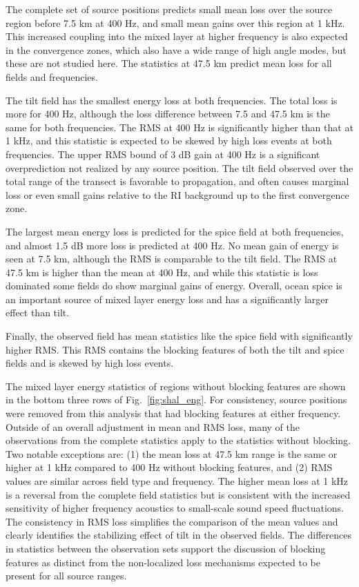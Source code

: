 \documentclass[preprint,NumberedRefs]{JASA}
\begin{document}
The complete set of source positions predicts small mean loss over the source region before 7.5 km at 400 Hz, and small mean gains over this region at 1 kHz. This increased coupling into the mixed layer at higher frequency is also expected in the convergence zones, which also have a wide range of high angle modes, but these are not studied here. The statistics at 47.5 km predict mean loss for all fields and frequencies.

The tilt field has the smallest energy loss at both frequencies. The total loss is more for 400 Hz, although the loss difference between 7.5 and 47.5 km is the same for both frequencies. The RMS at 400 Hz is significantly higher than that at 1 kHz, and this statistic is expected to be skewed by high loss events at both frequencies. The upper RMS bound of 3 dB gain at 400 Hz is a significant overprediction not realized by any source position. The tilt field observed over the total range of the transect is favorable to propagation, and often causes marginal loss or even small gains relative to the RI background up to the first convergence zone.

The largest mean energy loss is predicted for the spice field at both frequencies, and almost 1.5 dB more loss is predicted at 400 Hz. No mean gain of energy is seen at 7.5 km, although the RMS is comparable to the tilt field. The RMS at 47.5 km is higher than the mean at 400 Hz, and while this statistic is loss dominated some fields do show marginal gains of energy. Overall, ocean spice is an important source of mixed layer energy loss and has a significantly larger effect than tilt.

Finally, the observed field has mean statistics like the spice field with significantly higher RMS. This RMS contains the blocking features of both the tilt and spice fields and is skewed by high loss events.

The mixed layer energy statistics of regions without blocking features are shown in the bottom three rows of Fig.~\ref{fig:shal_eng}. For consistency, source positions were removed from this analysis that had blocking features at either frequency. Outside of an overall adjustment in mean and RMS loss, many of the observations from the complete statistics apply to the statistics without blocking. Two notable exceptions are: (1) the mean loss at 47.5 km range is the same or higher at 1 kHz compared to 400 Hz without blocking features, and (2) RMS values are similar across field type and frequency. The higher mean loss at 1 kHz is a reversal from the complete field statistics but is consistent with the increased sensitivity of higher frequency acoustics to small-scale sound speed fluctuations. The consistency in RMS loss simplifies the comparison of the mean values and clearly identifies the stabilizing effect of tilt in the observed fields. The differences in statistics between the observation sets support the discussion of blocking features as distinct from the non-localized loss mechanisms expected to be present for all source ranges.
\end{document}
